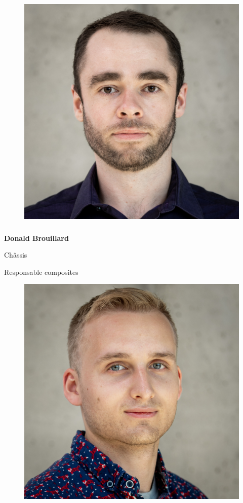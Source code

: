 \documentclass[a0paper,portrait]{baposter}
\begin{document}
\begin{poster}
{\begin{figure}
\includegraphics[width=.9\linewidth]{img/membres/Donald-Brouillard-2.jpg} 
\end{figure}
\subsubsection*{}
\vspace{2mm}
\textbf{Donald Brouillard}

Ch\^assis

Responsable composites

\begin{figure}
\includegraphics[width=.9\linewidth]{img/membres/Marco-Roger-3.jpg} 
\end{figure}
}
\end{poster}
\end{document}
